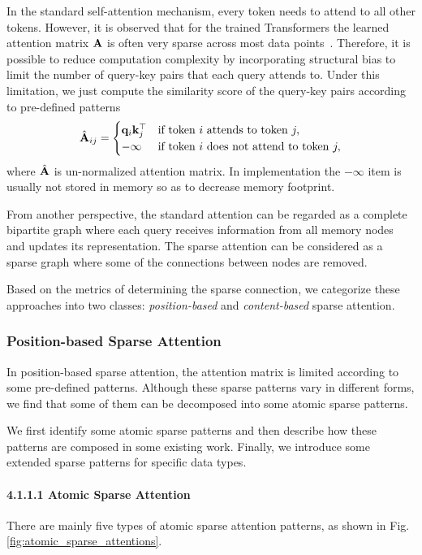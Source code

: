 \documentclass[manuscript,acmsmall,screen,nonacm]{acmart}
\theoremstyle{definition}
\begin{document}
In the standard self-attention mechanism, every token needs to attend to all other tokens.
However, it is observed that for the trained Transformers the learned attention matrix $\mathbf{A}$ is often very sparse across most data points~\cite{child2019generating}.
Therefore, it is possible to reduce computation complexity by incorporating structural bias to limit the number of query-key pairs that each query attends to. Under this limitation, we just compute the similarity score of the query-key pairs according to pre-defined patterns
\begin{equation}\label{Sparse attention:position-based}
    \mathrm{\hat{\mathbf{A}}}_{ij} = \begin{cases} \mathbf{q}_i\mathbf{k}_{j}^\top  & \text{if token }i\text{ attends to token }j,\\
    -\infty & \text{if token }i\text{ does not attend to token }j,
    \end{cases}
\end{equation}\label{eq:sparseattn}
where $\mathrm{\hat{\mathbf{A}}}$ is un-normalized attention matrix. In implementation the $-\infty$ item is usually not stored in memory so as to decrease memory footprint.

From another perspective, the standard attention can be regarded as a complete bipartite graph where each query receives information from all memory nodes and updates its representation.
The sparse attention can be considered as a sparse graph where some of the connections between nodes are removed.

Based on the metrics of determining the sparse connection, we categorize these approaches into two classes: \textit{position-based} and \textit{content-based} sparse attention.

\subsubsection{Position-based Sparse Attention}\label{sec:pos_based}

In position-based sparse attention, the attention matrix is limited according to some pre-defined patterns.
Although these sparse patterns vary in different forms, we find that some of them can be decomposed into some atomic sparse patterns.

We first identify some atomic sparse patterns and then describe how these patterns are composed in some existing work. Finally, we introduce some extended sparse patterns for specific data types.

\paragraph{4.1.1.1 Atomic Sparse Attention}
There are mainly five types of atomic sparse attention patterns, as shown in Fig. \ref{fig:atomic_sparse_attentions}.
\end{document}
